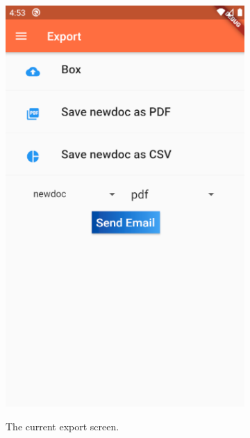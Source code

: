 \documentclass[onecolumn, draftclsnofoot,10pt, compsoc]{IEEEtran}
\begin{document}
\begin{figure}
\begin{subfigure}{.5\textwidth}
    \includegraphics[scale=0.5]{Images/export.png}
    \label{Fig 6.}
    \caption{ The current export screen.}
\end{subfigure}
\begin{subfigure}{.5\textwidth}

\end{subfigure}
\end{figure}
\end{document}
